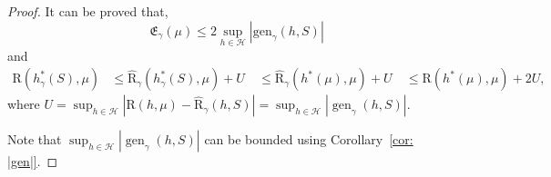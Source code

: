 \documentclass{article}
\theoremstyle{plain}
\theoremstyle{plain}
\theoremstyle{definition}
\theoremstyle{remark}
\newcommand{\var}{\mathrm{Var}}
\newcommand{\RTrue}{\mathrm{R}}
\newcommand{\RTET}{\mathrm{R}_{\gamma}}
\begin{document}
\begin{proof}
    It can be proved that, 
    \[ \mathfrak{E}_{\gamma}(\mu)\leq 2\sup_{h\in\mathcal{H}}| \mathrm{gen}_{\gamma}(h,S)|\]
and
 $$\begin{aligned} \mathrm{R}(h_\gamma^* (S),\mu) &\leq \hat{\mathrm{R}}_\gamma(h_\gamma^*(S),\mu)+U\ &\leq \hat{\mathrm{R}}_\gamma(h^*(\mu),\mu)+U\ &\leq \mathrm{R}(h^*(\mu),\mu)+2U, \end{aligned}$$ where $U=\sup_{h\in\mathcal{H}}|\mathrm{R}(h,\mu)-\hat{\mathrm{R}}_{\gamma}(h,S)|=\sup_{h\in\mathcal{H}}|\operatorname{gen}_{\gamma}(h,S)|.$

Note that $\sup_{h\in\mathcal{H}}|\operatorname{gen}_{\gamma}(h,S)|$ can be bounded using Corollary~\ref{cor: |gen|}.
 \end{proof}









\end{document}
